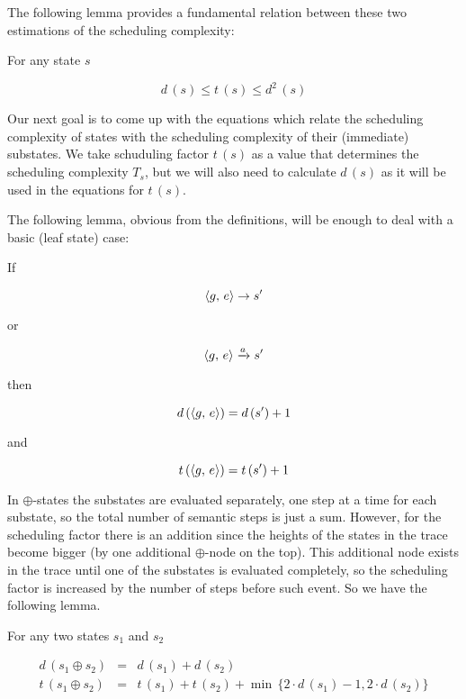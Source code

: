 The following lemma provides a fundamental relation between these two estimations of the scheduling complexity:

\begin{lemma}
  For any state $s$

  \[
  d\,(s) \le t\,(s) \le d^2\,(s)
  \]
  
\end{lemma}

Our next goal is to come up with the equations which relate the scheduling complexity of states with the scheduling complexity of their
(immediate) substates. We take schuduling factor $t\,(s)$ as a value that determines the scheduling complexity $T_s$, but we will also need to calculate $d\,(s)$ as it will be used in the equations for $t\,(s)$. 

The following lemma, obvious from the definitions, will be enough to deal with a basic (leaf state) case:

\begin{lemma}
  If

  \[\langle g ,\, e \rangle \rightarrow s^\prime\]

  or

  \[\langle g ,\, e \rangle \xrightarrow{a} s^\prime\]

  then

  \[d\,(\langle g ,\, e \rangle) = d\,(s^\prime) + 1\]

  and

  \[t\,(\langle g ,\, e \rangle) = t\,(s^\prime) + 1\]
\end{lemma}

In $\oplus$-states the substates are evaluated separately, one step at a time for each substate, so the total number of semantic steps is just a sum. However, for the scheduling factor there is an addition since the heights of the states in the trace become bigger (by one additional $\oplus$-node on the top). This additional node exists in the trace until one of the substates is evaluated completely, so the scheduling factor is increased by the number of steps before such event. So we have the following lemma.

\begin{lemma}
\label{lem:sum_estimation}
For any two states $s_1$ and $s_2$

\[
\begin{array}{rcl}
  d\,(s_1 \oplus s_2) &=& d\,(s_1) + d\,(s_2) \\

  t\,(s_1 \oplus s_2) &=& t\,(s_1) + t\,(s_2) + \min\,\{2\cdot d\,(s_1) - 1, 2\cdot d\,(s_2)\}
\end{array}
\]

\end{lemma}

